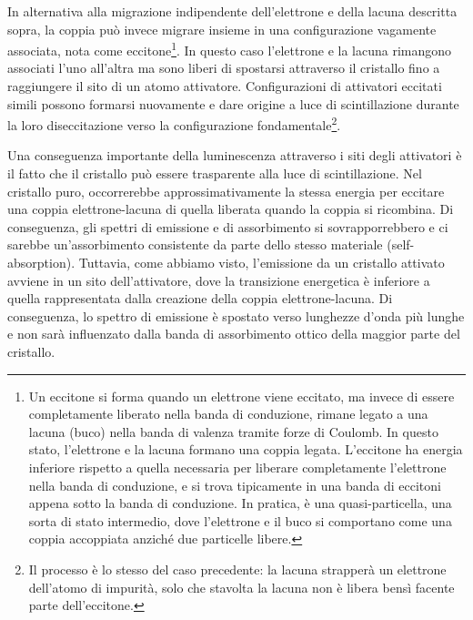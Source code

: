 In alternativa alla migrazione indipendente dell'elettrone e della lacuna descritta sopra, la coppia può invece migrare insieme in una configurazione vagamente associata, nota come eccitone\footnote{Un eccitone si forma quando un elettrone viene eccitato, ma invece di essere completamente liberato nella banda di conduzione, rimane legato a una lacuna (buco) nella banda di valenza tramite forze di Coulomb. In questo stato, l'elettrone e la lacuna formano una coppia legata. L'eccitone ha energia inferiore rispetto a quella necessaria per liberare completamente l'elettrone nella banda di conduzione, e si trova tipicamente in una banda di eccitoni appena sotto la banda di conduzione. In pratica, è una quasi-particella, una sorta di stato intermedio, dove l'elettrone e il buco si comportano come una coppia accoppiata anziché due particelle libere.}. In questo caso l'elettrone e la lacuna rimangono associati l'uno all'altra ma sono liberi di spostarsi attraverso il cristallo fino a raggiungere il sito di un atomo attivatore. Configurazioni di attivatori eccitati simili possono formarsi nuovamente e dare origine a luce di scintillazione durante la loro diseccitazione verso la configurazione fondamentale\footnote{Il processo è lo stesso del caso precedente: la lacuna strapperà un elettrone dell'atomo di impurità, solo che stavolta la lacuna non è libera bensì facente parte dell'eccitone.}.

Una conseguenza importante della luminescenza attraverso i siti degli attivatori è il fatto che il cristallo può essere trasparente alla luce di scintillazione. Nel cristallo puro, occorrerebbe approssimativamente la stessa energia per eccitare una coppia elettrone-lacuna di quella liberata quando la coppia si ricombina. Di conseguenza, gli spettri di emissione e di assorbimento si sovrapporrebbero e ci sarebbe un'assorbimento consistente da parte dello stesso materiale (self-absorption). Tuttavia, come abbiamo visto, l'emissione da un cristallo attivato avviene in un sito dell'attivatore, dove la transizione energetica è inferiore a quella rappresentata dalla creazione della coppia elettrone-lacuna. Di conseguenza, lo spettro di emissione è spostato verso lunghezze d'onda più lunghe e non sarà influenzato dalla banda di assorbimento ottico della maggior parte del cristallo.

